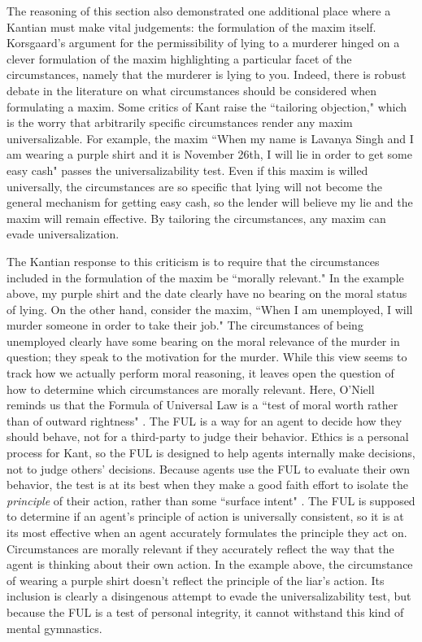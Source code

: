 \begin{isabellebody}
\begin{isamarkuptext}
The reasoning of this section also demonstrated one additional place where a Kantian must make vital judgements:
the formulation of the maxim itself. Korsgaard's argument for the permissibility of lying to a 
murderer hinged on a clever formulation of the maxim highlighting a particular facet of the circumstances, 
namely that the murderer is lying to you. Indeed, there is robust debate in the literature on what
circumstances should be considered when formulating a maxim. Some critics of Kant raise the ``tailoring
objection," which is the worry that arbitrarily specific circumstances render any maxim universalizable. For 
example, the maxim ``When my name is Lavanya Singh and I am wearing a purple shirt and it is November 26th, 
I will lie in order to get some easy cash" passes the universalizability test. Even if this maxim is 
willed universally, the circumstances are so specific that lying will not become the general mechanism
for getting easy cash, so the lender will believe my lie and the maxim will remain effective. By tailoring
the circumstances, any maxim can evade universalization.

The Kantian response to this criticism is to require that the circumstances included in the formulation
of the maxim be ``morally relevant." In the example above, my purple shirt and the date clearly have no bearing on 
the moral status of lying. On the other hand, consider the maxim, ``When I am unemployed, I will murder
someone in order to take their job." The circumstances of being unemployed clearly have some bearing on the moral
relevance of the murder in question; they speak to the motivation for the murder. While this view seems 
to track how we actually perform moral reasoning, it leaves open the question of how to determine
which circumstances are morally relevant. Here, O'Niell reminds us that the Formula of Universal Law is 
a ``test of moral worth rather than of outward rightness" \citep[98]{constofreason}. The FUL is a way 
for an agent to decide how they should behave, not for a third-party to judge their behavior. Ethics is 
a personal process for Kant, so the FUL is designed to help agents internally make decisions, not to 
judge others' decisions. Because agents use the FUL to evaluate their own behavior, the test is at its 
best when they make a good faith effort to isolate the \emph{principle} of their action, rather than some
``surface intent" \citep[87]{constofreason}. The FUL is supposed to determine if an agent's principle of action
is universally consistent, so it is at its most effective when an agent accurately formulates the principle
they act on. Circumstances are morally relevant if they accurately reflect the way that the agent is 
thinking about their own action. In the example above, the circumstance of wearing a purple shirt doesn't reflect
the principle of the liar's action. Its inclusion is clearly a disingenous attempt to evade the universalizability
test, but because the FUL is a test of personal integrity, it cannot withstand this kind of mental
gymnastics.


\end{isamarkuptext}
\end{isabellebody}
